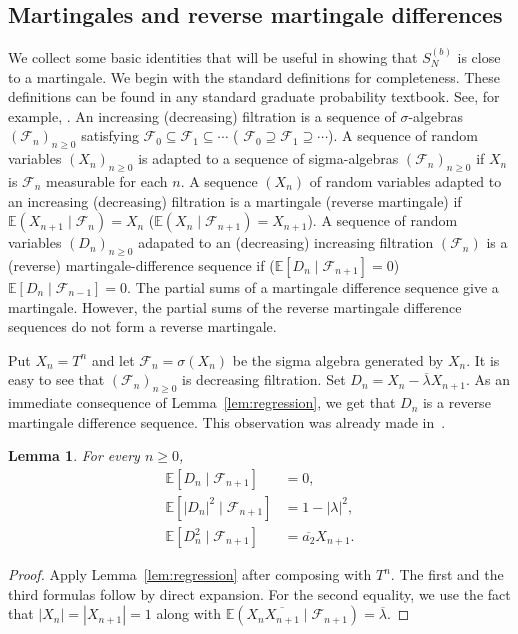 \documentclass[12pt, reqno, final, a4paper]{amsart}
\theoremstyle{plain}
\newtheorem{lemma}[theorem]{Lemma}
\theoremstyle{definition}
\theoremstyle{remark}
\newcommand{\E}{\mathbb E}
\newcommand{\1}{\mathbf 1}
\begin{document}
\subsection{Martingales and reverse martingale differences}\label{MRM}
We collect some basic identities that will be useful in showing that $S_N^{(b)}$ is close to a martingale. We begin with the standard definitions for completeness. These definitions can be found in any standard graduate probability textbook.  See, for example,
\cite[Chapters~10--12]{Williams1991}.
An increasing (decreasing) filtration is a
sequence of $\sigma$-algebras $(\mathcal F_n)_{n\ge0}$ satisfying
$\mathcal F_0\subseteq\mathcal F_1\subseteq\cdots$ (
$\mathcal F_0\supseteq\mathcal F_1\supseteq\cdots$). A sequence of random variables $(X_n)_{n\geq 0}$ is adapted to a sequence of sigma-algebras $(\mathcal{F}_n)_{n\geq 0}$ if $X_n$ is $\mathcal{F}_n$ measurable for each $n$. A sequence $(X_n)$ of random variables adapted to an increasing (decreasing) filtration is a martingale (reverse martingale) if
$\E(X_{n+1}\mid\mathcal F_n)=X_n$ ($\E(X_{n}\mid\mathcal F_{n+1})=X_{n+1}$). A sequence of random variables $(D_n)_{n\geq 0}$ adapated to an (decreasing) increasing filtration $(\mathcal{F}_n)$ is a (reverse) martingale-difference sequence if ($\E[D_n\mid\mathcal{F}_{n+1}]=0$) $\E[D_n\mid \mathcal F_{n-1}]=0$. The partial sums of a martingale difference sequence give a martingale. However, the partial sums of the reverse martingale difference sequences do not form a reverse martingale. 




Put $X_n=T^n$ and let $\mathcal F_n=\sigma(X_n)$ be the sigma algebra generated by $X_n$. It is easy to see that $(\mathcal{F}_n)_{n\geq 0}$ is decreasing filtration. Set $D_n=X_n-\overline\lambda X_{n+1}$. As an immediate consequence of Lemma~\ref{lem:regression}, we get that $D_n$ is a reverse martingale difference sequence. This observation was already made in~\cite{ChenFuLinQiu2026}.

\begin{lemma}\label{cor:MomentsOfDn}
For every $n\ge0$,
\begin{align*}
 \E[D_n\mid\mathcal F_{n+1}]&=0,\\
 \E[|D_n|^2\mid\mathcal F_{n+1}]&=1-|\lambda|^2,\\
 \E[D_n^2\mid\mathcal F_{n+1}]&=\overline{a_2}X_{n+1}.
\end{align*}
\end{lemma}
\begin{proof}
Apply Lemma~\ref{lem:regression} after composing with $T^n$. The first and the third formulas follow by direct expansion. For the second equality, we use the fact that $|X_n|=|X_{n+1}|=1$ along with
$\E(X_n\overline{X_{n+1}}\mid\mathcal F_{n+1})=\overline\lambda$.
\end{proof}
\end{document}

